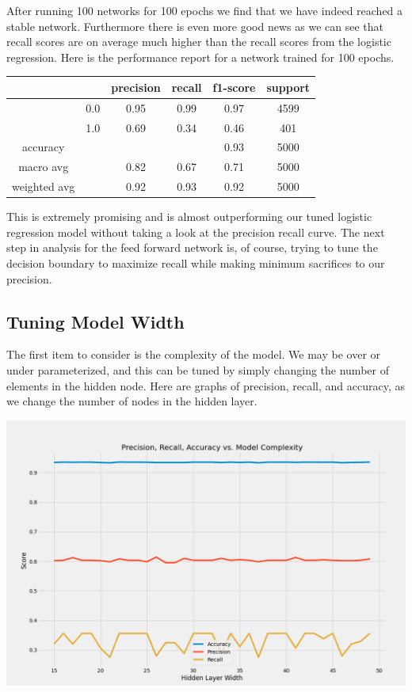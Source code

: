 \documentclass[12pt]{article}
\begin{document}
	After running 100 networks for 100 epochs we find that we have indeed reached a stable network. Furthermore there is even more good news as we can see that recall scores are on average much higher than the recall scores from the logistic regression. Here is the performance report for a network trained for 100 epochs. 
	
	\begin{tabular}{c|c|c|c|c|c}
		\hline
		& 		& 	precision &  recall  & f1-score   & support \\ \hline
		
		&  0.0	&		0.95 &     0.99   &  0.97   &  4599 \\ \hline
		&  1.0  &		0.69 &     0.34   &  0.46   &   401 \\ \hline
		
		accuracy    & & & &                       		  0.93   &   5000 \\ \hline
		macro avg   & &   			0.82   &   0.67  &    0.71   &   5000  \\ \hline
		weighted avg  & &   		0.92   &   0.93  &    0.92   &   5000 \\ \hline
	\end{tabular}
	
	This is extremely promising and is almost outperforming our tuned logistic regression model without taking a look at the precision recall curve. The next step in analysis for the feed forward network is, of course, trying to tune the decision boundary to maximize recall while making minimum sacrifices to our precision. 
	
	\subsection{Tuning Model Width}
	
	
	The first item to consider is the complexity of the model. We may be over or under parameterized, and this can be tuned by simply changing the number of elements in the hidden node. Here are graphs of precision, recall, and accuracy, as we change the number of nodes in the hidden layer. 
	
	
	\includegraphics[scale=0.4]{../notebooks/nn_width.png}
	
\end{document}
